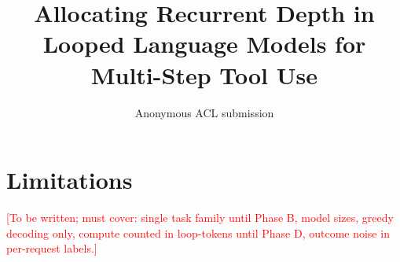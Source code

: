\documentclass[11pt]{article}
\title{Allocating Recurrent Depth in Looped Language Models for Multi-Step Tool Use}
\author{Anonymous ACL submission}
\newcommand{\pending}[1]{\textcolor{red}{[#1]}}
\begin{document}
\maketitle






\section*{Limitations}
\pending{To be written; must cover: single task family until Phase B, model sizes, greedy
decoding only, compute counted in loop-tokens until Phase D, outcome noise in per-request labels.}


\end{document}
